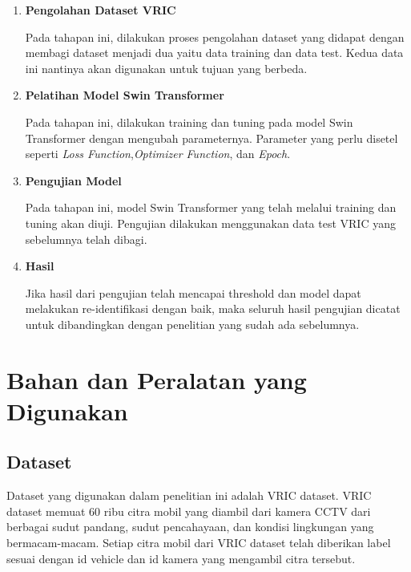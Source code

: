 \begin{enumerate}[nolistsep]

  \item \textbf{Pengolahan Dataset VRIC}
  
  Pada tahapan ini, dilakukan proses pengolahan dataset yang didapat dengan 
  membagi dataset menjadi dua yaitu data training dan data test. Kedua data 
  ini nantinya akan digunakan untuk tujuan yang berbeda.

  \item \textbf{Pelatihan Model Swin Transformer}
  
  Pada tahapan ini, dilakukan training dan tuning pada model Swin Transformer 
  dengan mengubah parameternya. Parameter yang perlu disetel seperti 
  \emph{Loss Function},\emph{Optimizer Function}, dan \emph{Epoch}.

  \item \textbf{Pengujian Model}
  
  Pada tahapan ini, model Swin Transformer yang telah melalui training dan 
  tuning akan diuji. Pengujian dilakukan menggunakan data test VRIC yang sebelumnya 
  telah dibagi.

  \item \textbf{Hasil}
  
  Jika hasil dari pengujian telah mencapai threshold dan model dapat melakukan \linebreak
  re-identifikasi dengan baik, maka seluruh hasil pengujian dicatat untuk dibandingkan 
  dengan penelitian yang sudah ada sebelumnya.

\end{enumerate}

\section{Bahan dan Peralatan yang Digunakan}
\label{sec:bahandanperalatanyangdigunakan}

\subsection{Dataset}

Dataset yang digunakan dalam penelitian ini adalah VRIC dataset. VRIC dataset memuat 
60 ribu citra mobil yang diambil dari kamera CCTV dari berbagai sudut pandang, sudut 
pencahayaan, dan kondisi lingkungan yang bermacam-macam. Setiap citra mobil dari VRIC 
dataset telah diberikan label sesuai dengan id vehicle dan id kamera yang mengambil 
citra tersebut.

